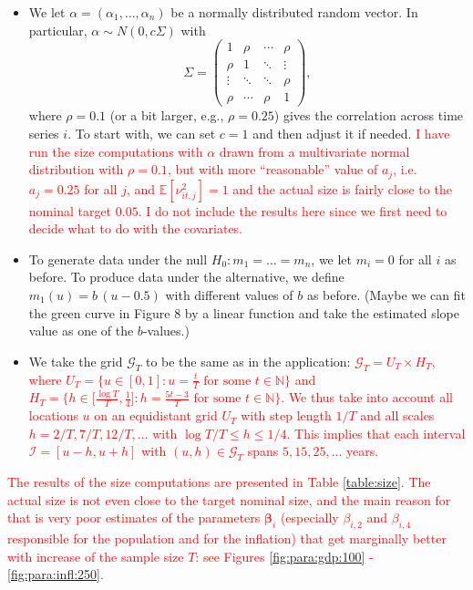 \documentclass[a4paper,12pt]{article}
\newcommand{\ex}{\mathbb{E}}        %
\newcommand{\bfbeta}{\bm{\beta}} %
\begin{document}
\begin{enumerate}[label=\arabic*.,leftmargin=0.6cm]
{\begin{itemize}[topsep=0pt]
\begin{itemize}[label=--,leftmargin=0.45cm,itemsep=0pt]
\item We let $\alpha = (\alpha_1,\ldots,\alpha_n)$ be a normally distributed random vector. In particular, $\alpha \sim N(0,c \Sigma)$ with
\[ \Sigma =
\begin{pmatrix}
1      & \rho   & \cdots & \rho   \\
\rho   & 1      & \ddots & \vdots \\
\vdots & \ddots & \ddots & \rho   \\
\rho   & \cdots & \rho   & 1
\end{pmatrix},
\]
where $\rho = 0.1$ (or a bit larger, e.g., $\rho = 0.25$) gives the correlation across time series $i$. To start with, we can set $c=1$ and then adjust it if needed. \textcolor{red}{I have run the size computations with $\alpha$ drawn from a multivariate normal distribution with $\rho = 0.1$, but with more ``reasonable'' value of $a_j$, i.e. $a_j = 0.25$ for all $j$, and $\ex[\nu^2_{it, j}] = 1$ and the actual size is fairly close to the nominal target $0.05$. I do not include the results here since we first need to decide what to do with the covariates.}

\item To generate data under the null $H_0: m_1 = \ldots = m_n$, we let $m_i = 0$ for all $i$ as before. To produce data under the alternative, we define $m_1(u) = b \, (u - 0.5) $ with different values of $b$ as before. (Maybe we can fit the green curve in Figure 8 by a linear function and take the estimated slope value as one of the $b$-values.) 

\item We take the grid $\mathcal{G}_T$ to be the same as in the application: \textcolor{red}{$\mathcal{G}_T = U_T \times H_T$, where $U_T = \big\{ u \in [0,1]: u = \textstyle{\frac{t}{T}} \text{ for some } t \in \mathbb{N} \big\}$ and $H_T = \big\{ h \in \big[ \textstyle{\frac{\log T}{T}}, \textstyle{\frac{1}{4}} \big]:  h = \textstyle{\frac{5t - 3}{T}} \text{ for some } t \in \mathbb{N} \big\}$. We thus take into account all locations $u$ on an equidistant grid $U_T$ with step length $1/T$ and all scales $h=2/T, 7/T, 12/T,\ldots$ with $\log T /T \le h \le 1/4$. This implies that each interval $\mathcal{I} =[u-h,u+h]$ with $(u,h) \in \mathcal{G}_T$ spans $5, 15, 25, \ldots$ years.} 

\end{itemize}

\textcolor{red}{The results of the size computations are presented in Table \ref{table:size}. The actual size is not even close to the target nominal size, and the main reason for that is very poor estimates of the parameters $\bfbeta_i$ (especially $\beta_{i, 2}$ and $\beta_{i, 4}$ responsible for the population and for the inflation) that get marginally better with increase of the sample size $T$: see Figures \ref{fig:para:gdp:100} - \ref{fig:para:infl:250}.}


\end{itemize}}
\end{enumerate}
\end{document}
